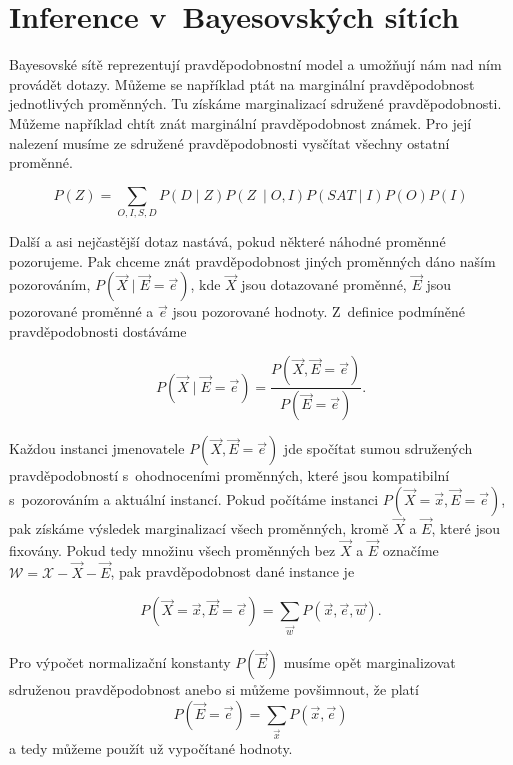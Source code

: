 \section{Inference v~Bayesovských sítích}

Bayesovské sítě reprezentují pravděpodobnostní model a umožňují nám nad ním provádět dotazy.
Můžeme se například ptát na marginální pravděpodobnost jednotlivých proměnných. 
Tu získáme marginalizací sdružené pravděpodobnosti.
Můžeme například chtít znát marginální pravděpodobnost známek. Pro její nalezení musíme ze sdružené pravděpodobnosti vysčítat všechny ostatní proměnné.

\begin{equation}
P(Z) = \sum_{O, I, S, D} P(D \mid Z) P(Z~\mid O, I) P(SAT \mid I) P(O) P(I)
\end{equation}

Další a asi nejčastější dotaz nastává, pokud některé náhodné proměnné pozorujeme. 
Pak chceme znát pravděpodobnost jiných proměnných dáno naším pozorováním, $P(\vec{X} \mid \vec{E} = \vec{e})$, kde $\vec{X}$ jsou dotazované proměnné, $\vec{E}$ jsou pozorované proměnné a $\vec{e}$ jsou pozorované hodnoty.
Z~definice podmíněné pravděpodobnosti dostáváme

\begin{equation}
P(\vec{X} \mid \vec{E} = \vec{e}) = \frac{P(\vec{X}, \vec{E} = \vec{e})}{P(\vec{E} = \vec{e})}.
\end{equation}

Každou instanci jmenovatele $P(\vec{X}, \vec{E} = \vec{e})$ jde spočítat sumou sdružených pravděpodobností s~ohodnoceními proměnných, které jsou kompatibilní s~pozorováním a aktuální instancí. 
Pokud počítáme instanci $P(\vec{X} = \vec{x}, \vec{E} = \vec{e})$, pak získáme výsledek marginalizací všech proměnných, kromě $\vec{X}$ a $\vec{E}$, které jsou fixovány.
Pokud tedy množinu všech proměnných bez $\vec{X}$ a $\vec{E}$ označíme $\mathcal{W} = \mathcal{X} - \vec{X} - \vec{E}$, pak pravděpodobnost dané instance je

\begin{equation}
P(\vec{X} = \vec{x}, \vec{E} = \vec{e}) = \sum_{\vec{w}} P(\vec{x}, \vec{e}, \vec{w}).
\end{equation}

Pro výpočet normalizační konstanty $P(\vec{E})$ musíme opět marginalizovat sdruženou pravděpodobnost anebo si můžeme povšimnout, že platí
\begin{equation}
P(\vec{E} = \vec{e}) = \sum_{\vec{x}} P(\vec{x}, \vec{e})
\end{equation}
a tedy můžeme použít už vypočítané hodnoty.

